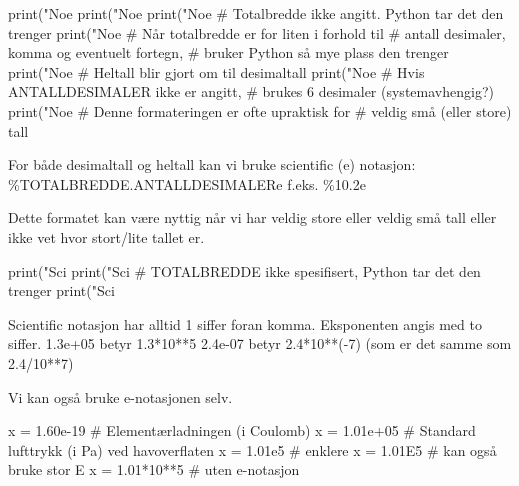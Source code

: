 \begin{usncodebox}

print("Noe %
print("Noe %
print("Noe %
                                     # Totalbredde ikke angitt. Python tar det den trenger
print("Noe %
                                     # Når totalbredde er for liten i forhold til 
                                     # antall desimaler, komma og eventuelt fortegn, 
                                     # bruker Python så mye plass den trenger
print("Noe %
                                     # Heltall blir gjort om til desimaltall
print("Noe %
                                     # Hvis ANTALLDESIMALER ikke er angitt, 
                                     # brukes 6 desimaler (systemavhengig?) 
print("Noe %
                                     # Denne formateringen er ofte upraktisk for 
                                     # veldig små (eller store) tall
\end{usncodebox}

For både desimaltall og heltall kan vi bruke scientific (e) notasjon: 
\%TOTALBREDDE.ANTALLDESIMALERe   f.eks. \%10.2e
 
Dette formatet kan være nyttig når vi har veldig store eller veldig små tall eller ikke vet hvor stort/lite tallet er. 

\begin{usncodebox}
print("Sci %
print("Sci %
                                         # TOTALBREDDE ikke spesifisert, Python tar det den trenger
print("Sci %
\end{usncodebox}

Scientific notasjon har alltid 1 siffer foran komma. Eksponenten angis med to siffer.
1.3e+05 betyr 1.3*10**5
2.4e-07 betyr 2.4*10**(-7)   (som er det samme som 2.4/10**7)

Vi kan også bruke e-notasjonen selv.
\begin{usncodebox}
x = 1.60e-19    # Elementærladningen (i Coulomb) 
x = 1.01e+05    # Standard lufttrykk (i Pa) ved havoverflaten 
x = 1.01e5      # enklere
x = 1.01E5      # kan også bruke stor E
x = 1.01*10**5  # uten e-notasjon
\end{usncodebox}


